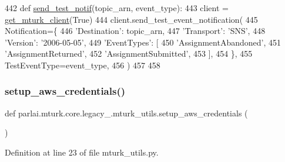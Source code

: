 \begin{DoxyCode}
442 \textcolor{keyword}{def }\hyperlink{namespaceparlai_1_1mturk_1_1core_1_1mturk__utils_a03b8f25675cb76e8b27205ca5d26e623}{send\_test\_notif}(topic\_arn, event\_type):
443     client = \hyperlink{namespaceparlai_1_1mturk_1_1core_1_1mturk__utils_a577e2527c04682284394b0951a090695}{get\_mturk\_client}(\textcolor{keyword}{True})
444     client.send\_test\_event\_notification(
445         Notification=\{
446             \textcolor{stringliteral}{'Destination'}: topic\_arn,
447             \textcolor{stringliteral}{'Transport'}: \textcolor{stringliteral}{'SNS'},
448             \textcolor{stringliteral}{'Version'}: \textcolor{stringliteral}{'2006-05-05'},
449             \textcolor{stringliteral}{'EventTypes'}: [
450                 \textcolor{stringliteral}{'AssignmentAbandoned'},
451                 \textcolor{stringliteral}{'AssignmentReturned'},
452                 \textcolor{stringliteral}{'AssignmentSubmitted'},
453             ],
454         \},
455         TestEventType=event\_type,
456     )
457 
458 
\end{DoxyCode}
\mbox{\label{namespaceparlai_1_1mturk_1_1core_1_1legacy__2018_1_1mturk__utils_a6e138f202e17ae4a1fde82b5581e1822}} 
\subsubsection{\texorpdfstring{setup\+\_\+aws\+\_\+credentials()}{setup\_aws\_credentials()}}
{\footnotesize\ttfamily def parlai.\+mturk.\+core.\+legacy\+\_.\+mturk\+\_\+utils.\+setup\+\_\+aws\+\_\+credentials (\begin{DoxyParamCaption}{ }\end{DoxyParamCaption})}



Definition at line 23 of file mturk\+\_\+utils.\+py.


